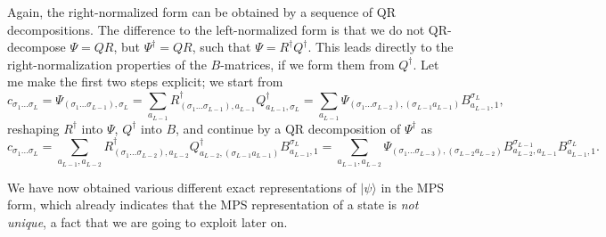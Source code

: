 \documentclass[a4paper,10pt,oneside,onecolumn,1p,times]{elsarticle}
\newcommand{\ket}[1]{\mbox{$| #1  \rangle$}}
\begin{document}
Again, the right-normalized form can be obtained by a sequence of QR decompositions. The difference to the left-normalized form is that we do not QR-decompose $\Psi=QR$, but $\Psi^\dagger=QR$, such that $\Psi = R^\dagger Q^\dagger$. This leads directly to the right-normalization properties of the $B$-matrices, if we form them from $Q^\dagger$. Let me make the first two steps explicit; we start from
\begin{equation}
c_{\sigma_1\ldots\sigma_L} = \Psi_{(\sigma_1\ldots\sigma_{L-1}),\sigma_L} =
\sum_{a_{L-1}} R^\dagger_{(\sigma_1\ldots\sigma_{L-1}),a_{L-1}} Q^\dagger_{a_{L-1},\sigma_L} =
\sum_{a_{L-1}} \Psi_{(\sigma_1\ldots\sigma_{L-2}),(\sigma_{L-1}a_{L-1})} B^{\sigma_L}_{a_{L-1},1},
\end{equation}
reshaping $R^\dagger$ into $\Psi$, $Q^\dagger$ into $B$, and continue by a QR decomposition of $\Psi^\dagger$ as 
\begin{equation}
c_{\sigma_1\ldots\sigma_L} = \sum_{a_{L-1},a_{L-2}} R^\dagger_{(\sigma_1\ldots\sigma_{L-2}),a_{L-2}} Q^\dagger_{a_{L-2},(\sigma_{L-1}a_{L-1})}  B^{\sigma_L}_{a_{L-1},1} 
= \sum_{a_{L-1},a_{L-2}} \Psi_{(\sigma_1\ldots\sigma_{L-3}),(\sigma_{L-2}a_{L-2})}
B^{\sigma_{L-1}}_{a_{L-2},a_{L-1}} B^{\sigma_L}_{a_{L-1},1} .
\end{equation}

We have now obtained various different exact representations of $\ket{\psi}$ in the MPS form, which already indicates that the MPS representation of a state is {\em not unique}, a fact that we are going to exploit later on.
\end{document}
